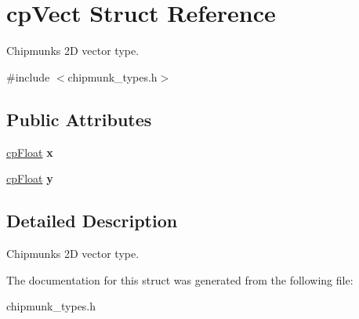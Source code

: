 \hypertarget{structcp_vect}{}\section{cp\+Vect Struct Reference}
\label{structcp_vect}


Chipmunk\textquotesingle{}s 2\+D vector type.  




{\ttfamily \#include $<$chipmunk\+\_\+types.\+h$>$}

\subsection*{Public Attributes}
\begin{DoxyCompactItemize}
\item 
\hypertarget{structcp_vect_a16371845f9474f321d137615edfc16ad}{}\hyperlink{group__basic_types_gac1ed65573e035bf892505768c852d8d3}{cp\+Float} {\bfseries x}\label{structcp_vect_a16371845f9474f321d137615edfc16ad}

\item 
\hypertarget{structcp_vect_afe915cf8f8e2694cdad97f0ce33bd4fd}{}\hyperlink{group__basic_types_gac1ed65573e035bf892505768c852d8d3}{cp\+Float} {\bfseries y}\label{structcp_vect_afe915cf8f8e2694cdad97f0ce33bd4fd}

\end{DoxyCompactItemize}


\subsection{Detailed Description}
Chipmunk\textquotesingle{}s 2\+D vector type. 

The documentation for this struct was generated from the following file\+:\begin{DoxyCompactItemize}
\item 
chipmunk\+\_\+types.\+h\end{DoxyCompactItemize}
